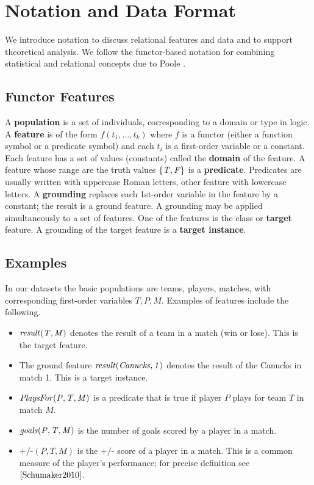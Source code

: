 \documentclass[conference]{IEEEtran}
\newcommand{\team}{T}
\newcommand{\player}{P}
\newcommand{\match}{M}
\newcommand{\plusminus}{\mbox{+/-}}
\begin{document}
\section{Notation and Data Format} We introduce notation to discuss relational features and data and to support theoretical analysis. We follow the functor-based notation for combining statistical and relational concepts due to Poole \cite{Poole2003}.

\subsection{Functor Features}
A \textbf{population} is a set of individuals, corresponding to a domain or type in logic. A \textbf{feature} is of the form $f(t_{1},\ldots,t_{k})$ where $f$ is a functor (either a function symbol or a predicate symbol) and each $t_{i}$ is a first-order variable or a constant. Each feature has a set of values (constants) called the \textbf{domain} of the feature.
A feature whose range are the truth values $\{\mathit{T},\mathit{F}\}$ is a \textbf{predicate}.
Predicates are usually written with uppercase Roman letters, other feature with lowercase letters.
A \textbf{grounding} replaces each 1st-order variable in the feature by a constant; the result is a ground feature. A grounding may be applied simultaneously to a set of features. One of the features is the class or \textbf{target} feature. A grounding of the target feature is a \textbf{target instance}.

\subsection{Examples} In our datasets the basic populations are teams, players, matches, with corresponding first-order variables $\team, \player, \match$. Examples of features include the following.

\begin{itemize}
\item $\it{result}(\team,\match)$ denotes the result of a team in a match (win or lose). This is the target feature.
\item The ground feature $\it{result}(Canucks,1)$ denotes the result of the Canucks in match 1. This is a target instance.
\item $\it{PlaysFor}(\player,\team,\match)$ is a predicate that is true if player $\player$ plays for team $\team$ in match $\match$.
\item $\it{goals}(\player,\team,\match)$ is the number of goals scored by a player in a match.
\item $\plusminus(\player,\team,\match)$ is the $\plusminus$ score of a player in a match. This is a common measure of the player's performance; for precise definition see $\cite{Schumaker2010}$.
\end{itemize}
\end{document}
